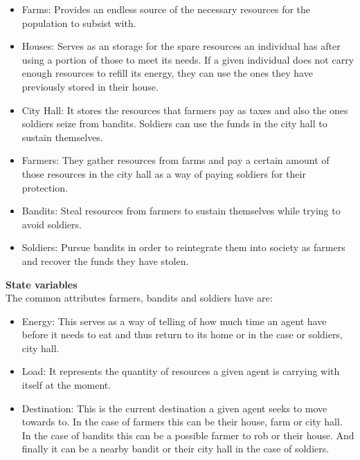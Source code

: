 \documentclass{wscpaperproc}
\begin{document}
\begin{itemize}
    \item Farms: Provides an endless source of the necessary resources for the
    population to subsist with.

    \item Houses: Serves as an storage for the spare resources an individual has
    after using a portion of those to meet its needs. If a given individual
    does not carry enough resources to refill its energy, they can use the
    ones they have previously stored in their house.

    \item City Hall: It stores the resources that farmers pay as taxes and also
    the ones soldiers seize from bandits. Soldiers can use the funds in the
    city hall to sustain themselves.

    \item Farmers: They gather resources from farms and pay a certain amount of
    those resources in the city hall as a way of paying soldiers for their
    protection.

    \item Bandits: Steal resources from farmers to sustain themselves while
    trying to avoid soldiers.

    \item Soldiers: Pursue bandits in order to reintegrate them into society as
    farmers and recover the funds they have stolen.
\end{itemize}

\newpage

\noindent \textbf{State variables}\\

\noindent The common attributes farmers, bandits and soldiers have are:

\begin{itemize}
    \item Energy: This serves as a way of telling of how much time an agent
    have before it needs to eat and thus return to its home or in the case or
    soldiers, city hall.

    \item Load: It represents the quantity of resources a given agent is
    carrying with itself at the moment.

    \item Destination: This is the current destination a given agent seeks to
    move towards to. In the case of farmers this can be their house, farm or
    city hall. In the case of bandits this can be a possible farmer to rob or
    their house. And finally it can be a nearby bandit or their city hall in
    the case of soldiers.
\end{itemize}
\end{document}
